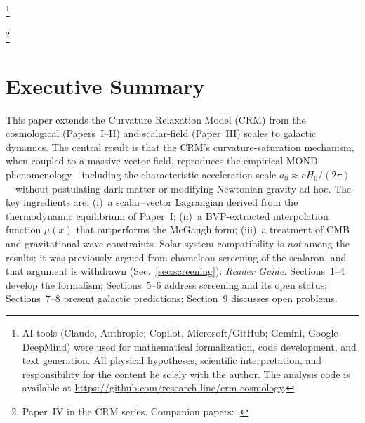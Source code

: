 \documentclass[aps,prd,twocolumn,superscriptaddress,nofootinbib]{revtex4-2}
\begin{document}

\thanks{AI tools (Claude, Anthropic; Copilot, Microsoft/GitHub; Gemini, Google DeepMind) were used for mathematical formalization, code development, and text generation. All physical hypotheses, scientific interpretation, and responsibility for the content lie solely with the author. The analysis code is available at \url{https://github.com/research-line/crm-cosmology}.}

\thanks{Paper~IV in the CRM series. Companion papers: \cite{Geiger2026,Geiger2026b,Geiger2026c}.}

\maketitle


\section*{Executive Summary}

This paper extends the Curvature Relaxation Model (CRM) from the cosmological (Papers~I--II) and scalar-field (Paper~III) scales to galactic dynamics. The central result is that the CRM's curvature-saturation mechanism, when coupled to a massive vector field, reproduces the empirical MOND phenomenology---including the characteristic acceleration scale $a_0 \approx cH_0/(2\pi)$---without postulating dark matter or modifying Newtonian gravity ad hoc. The key ingredients are: (i)~a scalar--vector Lagrangian derived from the thermodynamic equilibrium of Paper~I; (ii)~a BVP-extracted interpolation function $\mu(x)$ that outperforms the McGaugh form; (iii)~a treatment of CMB and gravitational-wave constraints. Solar-system compatibility is \textit{not} among the results: it was previously argued from chameleon screening of the scalaron, and that argument is withdrawn (Sec.~\ref{sec:screening}). \textit{Reader Guide:} Sections~1--4 develop the formalism; Sections~5--6 address screening and its open status; Sections~7--8 present galactic predictions; Section~9 discusses open problems.

\end{document}
